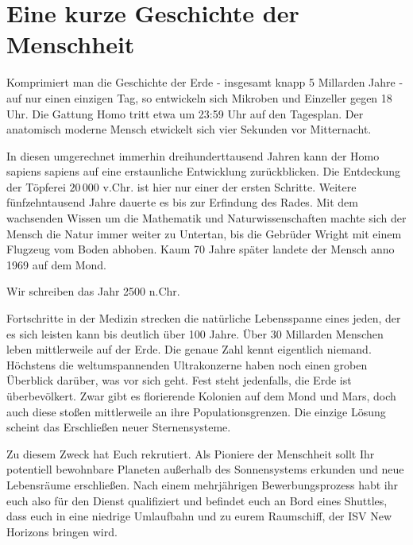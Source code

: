\chapter[Prolog]{Eine kurze Geschichte der Menschheit}

Komprimiert man die Geschichte der Erde - insgesamt knapp 5 Millarden Jahre - auf nur einen einzigen Tag, so entwickeln sich Mikroben und Einzeller gegen
18 Uhr. Die Gattung Homo tritt etwa um 23:59 Uhr auf den Tagesplan. Der anatomisch moderne Mensch etwickelt sich vier Sekunden vor Mitternacht.

In diesen umgerechnet immerhin dreihunderttausend Jahren kann der Homo sapiens sapiens auf eine erstaunliche Entwicklung zurückblicken. Die Entdeckung der
Töpferei $20\,000$ v.Chr. ist hier nur einer der ersten Schritte. Weitere fünfzehntausend Jahre dauerte es bis zur Erfindung des Rades. Mit dem wachsenden
Wissen um die Mathematik und Naturwissenschaften machte sich der Mensch die Natur immer weiter zu Untertan, bis die Gebrüder Wright mit einem Flugzeug vom
Boden abhoben. Kaum 70 Jahre später landete der Mensch anno 1969 auf dem Mond.

Wir schreiben das Jahr 2500 n.Chr.

Fortschritte in der Medizin strecken die natürliche Lebensspanne eines jeden, der es sich leisten kann bis deutlich über 100 Jahre. Über 30 Millarden
Menschen leben mittlerweile auf der Erde. Die genaue Zahl kennt eigentlich niemand. Höchstens die weltumspannenden Ultrakonzerne haben noch einen groben
Überblick darüber, was vor sich geht. Fest steht jedenfalls, die Erde ist überbevölkert. Zwar gibt es florierende Kolonien auf dem Mond und Mars, doch auch
diese stoßen mittlerweile an ihre Populationsgrenzen. Die einzige Lösung scheint das Erschließen neuer Sternensysteme.

Zu diesem Zweck hat  Euch rekrutiert. Als Pioniere der Menschheit sollt Ihr potentiell bewohnbare Planeten außerhalb des Sonnensystems
erkunden und neue Lebensräume erschließen. Nach einem mehrjährigen Bewerbungsprozess habt ihr euch also für den Dienst qualifiziert und befindet euch an
Bord eines Shuttles, dass euch in eine niedrige Umlaufbahn und zu eurem Raumschiff, der ISV New Horizons bringen wird.
